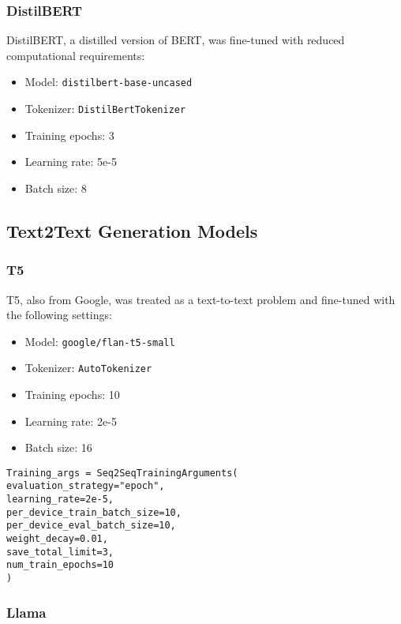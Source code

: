 \documentclass[conference]{IEEEtran}
\begin{document}
        \subsubsection{DistilBERT}

            DistilBERT, a distilled version of BERT, was fine-tuned with reduced computational requirements:
            \begin{itemize}
                \item Model: \texttt{distilbert-base-uncased}
                \item Tokenizer: \texttt{DistilBertTokenizer}
                \item Training epochs: 3
                \item Learning rate: 5e-5
                \item Batch size: 8
            \end{itemize}
            
    \subsection{Text2Text Generation Models}

        \subsubsection{T5}

            T5, also from Google, was treated as a text-to-text problem and fine-tuned with the following settings:
            \begin{itemize}
                \item Model: \texttt{google/flan-t5-small}
                \item Tokenizer: \texttt{AutoTokenizer}
                \item Training epochs: 10
                \item Learning rate: 2e-5
                \item Batch size: 16
            \end{itemize}

            \begin{verbatim}
Training_args = Seq2SeqTrainingArguments(
evaluation_strategy="epoch",
learning_rate=2e-5,
per_device_train_batch_size=10,
per_device_eval_batch_size=10,
weight_decay=0.01,
save_total_limit=3,
num_train_epochs=10
)
            \end{verbatim}

        \subsubsection{Llama}
\end{document}
